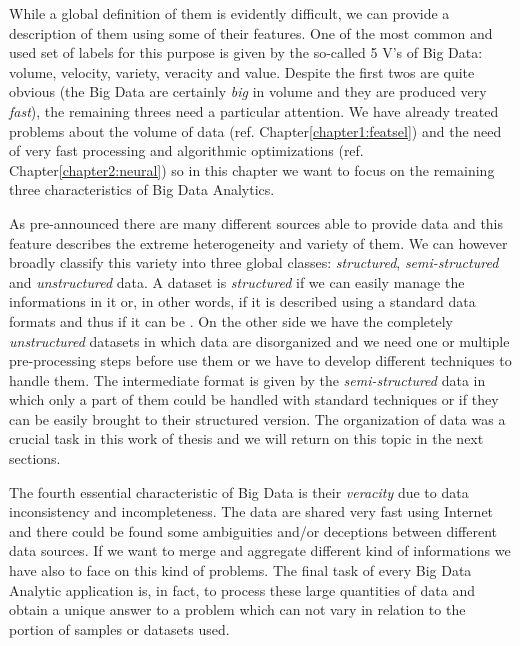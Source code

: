 \documentclass{standalone}
\begin{document}
While a global definition of them is evidently difficult, we can provide a description of them using some of their  features.
One of the most common and used set of labels for this purpose is given by the so-called 5 V's of Big Data: volume, velocity, variety, veracity and value.
Despite the first twos are quite obvious (the Big Data are certainly \emph{big} in volume and they are produced very \emph{fast}), the remaining threes need a particular attention.
We have already treated problems about the volume of data (ref. Chapter\ref{chapter1:featsel}) and the need of very fast processing and algorithmic optimizations (ref. Chapter\ref{chapter2:neural}) so in this chapter we want to focus on the remaining three characteristics of Big Data Analytics.

As pre-announced there are many different sources able to provide data and this feature describes the extreme heterogeneity and variety of them.
We can however broadly classify this variety into three global classes: \emph{structured}, \emph{semi-structured} and \emph{unstructured} data.
A dataset is \emph{structured} if we can easily manage the informations in it or, in other words, if it is described using a standard data formats and thus if it can be .
On the other side we have the completely \emph{unstructured} datasets in which data are disorganized and we need one or multiple pre-processing steps before use them or we have to develop different techniques to handle them.
The intermediate format is given by the \emph{semi-structured} data in which only a part of them could be handled with standard techniques or if they can be easily brought to their structured version.
The organization of data was a crucial task in this work of thesis and we will return on this topic in the next sections.

The fourth essential characteristic of Big Data is their \emph{veracity} due to data inconsistency and incompleteness.
The data are shared very fast using Internet and there could be found some ambiguities and/or deceptions between different data sources.
If we want to merge and aggregate different kind of informations we have also to face on this kind of problems.
The final task of every Big Data Analytic application is, in fact, to process these large quantities of data and obtain a unique answer to a problem which can not vary in relation to the portion of samples or datasets used.
\end{document}
